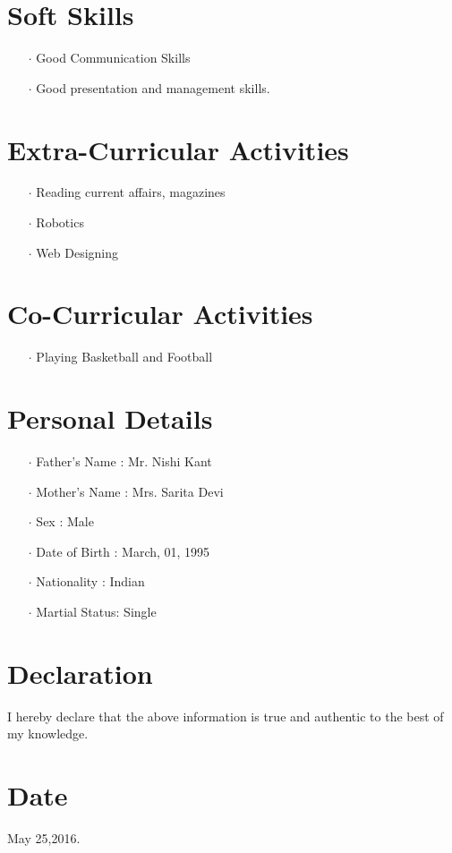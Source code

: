 \documentclass[11pt]{article}
\begin{document}
	\section*{Soft Skills}
	\begin{itemize}
		\item[$\cdot$] Good Communication Skills		\item[$\cdot$]Good presentation and management skills.
	\end{itemize}
	\section*{Extra-Curricular Activities}
	\begin{itemize}
		\item[$\cdot$]Reading current affairs, magazines
		\item[$\cdot$]Robotics
		\item[$\cdot$]Web Designing
	\end{itemize}
	\section*{Co-Curricular Activities}
	\begin{itemize}
		\item[$\cdot$] Playing Basketball and Football
	\end{itemize}
	\section*{Personal Details}
	\begin{itemize}
		\item[$\cdot$]Father's Name : Mr. Nishi Kant
		\item[$\cdot$]Mother's Name : Mrs. Sarita Devi
		\item[$\cdot$]Sex           : Male
		\item[$\cdot$]Date of Birth : March, 01, 1995
		\item[$\cdot$]Nationality   : Indian
		\item[$\cdot$]Martial Status: Single
	\end{itemize}
	\section*{Declaration} I hereby declare that the above information is true and authentic to the best of my knowledge.
	\section*{Date} May 25,2016.


	
\end{document}
